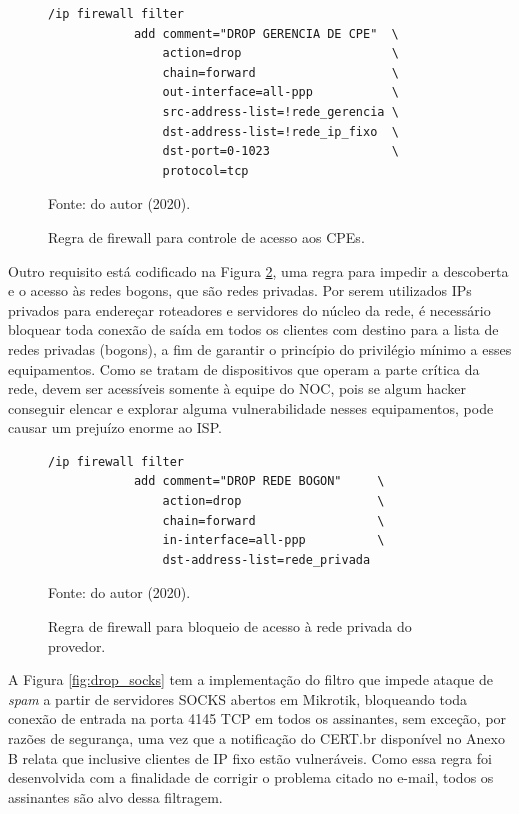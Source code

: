     \begin{figure}[!htb]
        \centering
        \caption{Regra de firewall para controle de acesso aos CPEs.} 
        \label{fig:drop_cpe}
        
        \begin{Verbatim}[fontsize=\normalsize]
            /ip firewall filter
            add comment="DROP GERENCIA DE CPE"  \
                action=drop                     \
                chain=forward                   \
                out-interface=all-ppp           \
                src-address-list=!rede_gerencia \
                dst-address-list=!rede_ip_fixo  \
                dst-port=0-1023                 \
                protocol=tcp
        \end{Verbatim} 

        {\small Fonte: do autor (2020).} 
    \end{figure}
    
    Outro requisito está codificado na Figura \ref{fig:drop_bogon}, uma regra para impedir a descoberta e o acesso às redes bogons, que são redes privadas. Por serem utilizados IPs privados para endereçar roteadores e servidores do núcleo da rede, é necessário bloquear toda conexão de saída em todos os clientes com destino para a lista de redes privadas (bogons), a fim de garantir o princípio do privilégio mínimo a esses equipamentos. Como se tratam de dispositivos que operam a parte crítica da rede, devem ser acessíveis somente à equipe do NOC, pois se algum hacker conseguir elencar e explorar alguma vulnerabilidade nesses equipamentos, pode causar um prejuízo enorme ao ISP.
    
    \begin{figure}[!htb]
        \centering
        \caption{Regra de firewall para bloqueio de acesso à rede privada do provedor.} 
        \label{fig:drop_bogon}
        
        \begin{Verbatim}[fontsize=\normalsize]
            /ip firewall filter
            add comment="DROP REDE BOGON"     \
                action=drop                   \
                chain=forward                 \
                in-interface=all-ppp          \
                dst-address-list=rede_privada
        \end{Verbatim} 

        {\small Fonte: do autor (2020).} 
    \end{figure}
    
    A Figura \ref{fig:drop_socks} tem a implementação do filtro que impede ataque de \textit{spam} a partir de servidores SOCKS abertos em Mikrotik, bloqueando toda conexão de entrada na porta 4145 TCP em todos os assinantes, sem exceção, por razões de segurança, uma vez que a notificação do CERT.br disponível no Anexo B relata que inclusive clientes de IP fixo estão vulneráveis. Como essa regra foi desenvolvida com a finalidade de corrigir o problema citado no e-mail, todos os assinantes são alvo dessa filtragem.
    
